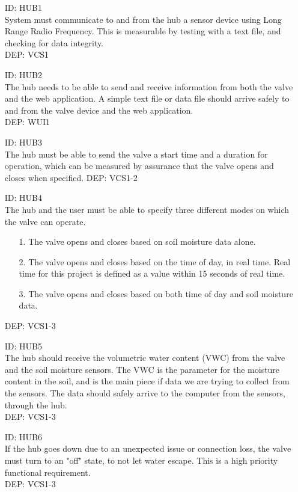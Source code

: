 \documentclass[onecolumn, draftclsnofoot,10pt, compsoc]{IEEEtran}
\newcounter{subsubsubsection}[subsubsection]
\newcounter{subsubsubsubsection}[subsubsubsection]
\begin{document}
	\begin{itemize}                
		\item[]{
			ID: HUB1\\
			System must communicate to and from the hub a sensor device using Long Range Radio Frequency.
			This is measurable by testing with a text file, and checking for data integrity.\\
			DEP: VCS1
		}
		
		\item[]{
			ID: HUB2\\
			The hub needs to be able to send and receive information from both the valve and the web application. 
			A simple text file or data file should arrive safely to and from the valve device and the web application.\\
			DEP: WUI1
		}
		
		\item[]{
			ID: HUB3\\
			The hub must be able to send the valve a start time and a duration for operation, which can be measured by assurance that the valve opens and closes when specified.
			DEP: VCS1-2
		}
		
		\item[]{
			ID: HUB4\\
			The hub and the user must be able to specify three different modes on which the valve can operate.                 
			\begin{itemize}
				\item[1.] The valve opens and closes based on soil moisture data alone.
				\item[2.] The valve opens and closes based on the time of day, in real time.
				Real time for this project is defined as a value within 15 seconds of real time.
				\item[3.] The valve opens and closes based on both time of day and soil moisture data.
			\end{itemize}
			
			DEP: VCS1-3
		} 
		\item[]{
			ID: HUB5\\
			The hub should receive the volumetric water content (VWC) from the valve and the soil moisture sensors.
			The VWC is the parameter for the moisture content in the soil, and is the main piece if data we are trying to collect from the sensors.
			The data should safely arrive to the computer from the sensors, through the hub.\\
			DEP: VCS1-3
		}
		\item[]{
			ID: HUB6\\
			If the hub goes down due to an unexpected issue or connection loss, the valve must turn to an "off" state, to not let water escape.
			This is a high priority functional requirement.\\
			DEP: VCS1-3
		}
		

\end{itemize}
\end{document}
